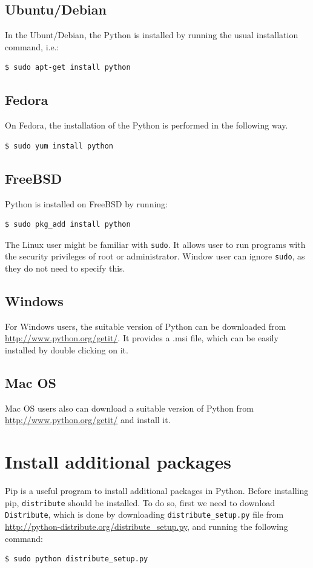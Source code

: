 \documentclass[10pt]{book}
\begin{document}

\subsection{Ubuntu/Debian}
In the Ubunt/Debian, the Python is installed by running the usual installation command, i.e.:
\beforeverb
\begin{verbatim}
$ sudo apt-get install python
\end{verbatim}
\afterverb

\subsection{Fedora}
On Fedora, the installation of the Python is performed in the following way.
\beforeverb
\begin{verbatim}
$ sudo yum install python
\end{verbatim}
\afterverb

\subsection{FreeBSD}
Python is installed on FreeBSD by running:
\beforeverb
\begin{verbatim}
$ sudo pkg_add install python
\end{verbatim}
\afterverb
The Linux user might be familiar with \verb"sudo". It allows user to run programs with the security privileges of root or administrator. Window user can ignore \verb"sudo", as they do not need to specify this. \\

\subsection{Windows}
For Windows users, the suitable version of Python can be downloaded from \url{http://www.python.org/getit/}. It provides a .msi file, which can be easily installed by double clicking on it.

\subsection{Mac OS}
Mac OS users also can download a suitable version of Python from \url{http://www.python.org/getit/} and install it.


\section{Install additional packages}
\label{install}
Pip is a useful program to install additional packages in Python. Before installing pip, \verb"distribute" should be installed. To do so, first we need to download \verb"Distribute", which is done by downloading \verb"distribute_setup.py" file from \url{http://python-distribute.org/distribute\_setup.py}, and running the following command:
\beforeverb
\begin{verbatim}
$ sudo python distribute_setup.py
\end{verbatim}
\afterverb
\end{document}
